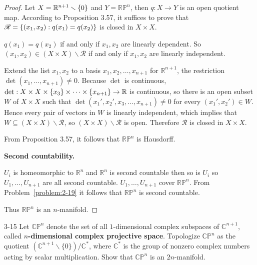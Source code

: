 \begin{proof}
    Let $X = \mathbb{R}^{n+1}\smallsetminus\left\{{0}\right\}$ and $Y = \mathbb{RP}^{n}$, then $q: X\to Y$ is an open quotient map. According to Proposition 3.57, it suffices to prove that $\mathscr{R} = \left\{{ (x_{1}, x_{2}) : q(x_{1}) = q(x_{2}) }\right\}$ is closed in $X\times X$.

    $q(x_{1}) = q(x_{2})$ if and only if $x_{1}, x_{2}$ are linearly dependent. So $(x_{1}, x_{2}) \in (X\times X)\smallsetminus\mathscr{R}$ if and only if $x_{1}, x_{2}$ are linearly independent.

    Extend the list $x_{1}, x_{2}$ to a basis $x_{1}, x_{2}, \ldots, x_{n+1}$ for $\mathbb{R}^{n+1}$, the restriction $\det(x_{1}, \ldots, x_{n+1}) \ne 0$. Because $\det$ is continuous, $\det: X\times X\times\left\{{x_{3}}\right\}\times\cdots\times\left\{{x_{n+1}}\right\} \to \mathbb{R}$ is continuous, so there is an open subset $W$ of $X\times X$ such that $\det(x_{1}', x_{2}', x_{3}, \ldots, x_{n+1}) \ne 0$ for every $(x_{1}', x_{2}') \in W$. Hence every pair of vectors in $W$ is linearly independent, which implies that $W \subseteq (X\times X)\smallsetminus\mathscr{R}$, so $(X\times X)\smallsetminus\mathscr{R}$ is open. Therefore $\mathscr{R}$ is closed in $X\times X$.

    From Proposition 3.57, it follows that $\mathbb{RP}^{n}$ is Hausdorff.

    \textbf{Second countability.}

    $U_{i}$ is homeomorphic to $\mathbb{R}^{n}$ and $\mathbb{R}^{n}$ is second countable then so is $U_{i}$ so $U_{1}, \ldots, U_{n+1}$ are all second countable. $U_{1}, \ldots, U_{n+1}$ cover $\mathbb{RP}^{n}$. From Problem~\ref{problem:2-19} it follows that $\mathbb{RP}^{n}$ is second countable.

    Thus $\mathbb{RP}^{n}$ is an $n$-manifold.
\end{proof}

\begin{problem}{3-15}\label{problem:3-15}
Let ${\mathbb{CP}}^{n}$ denote the set of all $1$-dimensional complex subspaces of $\mathbb{C}^{n+1}$, called \textbf{$n$-dimensional complex projective space}. Topologize ${\mathbb{CP}}^{n}$ as the quotient ${(\mathbb{C}^{n+1}\smallsetminus \{0\})}/\mathbb{C}^{*}$, where $\mathbb{C}^{*}$ is the group of nonzero complex numbers acting by scalar multiplication. Show that $\mathbb{CP}^{n}$ is an $2n$-manifold.
\end{problem}

